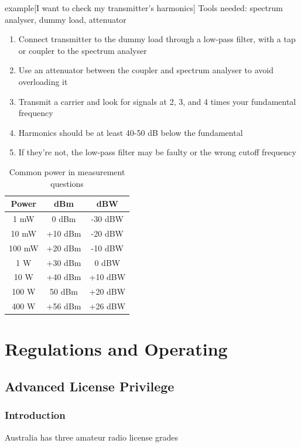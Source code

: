 \documentclass{article}
\begin{document}
\begin{callout}{example}[I want to check my transmitter's harmonics]
    Tools needed: spectrum analyser, dummy load, attenuator
    \begin{enumerate}
        \item Connect transmitter to the dummy load through a low-pass filter, with a tap or coupler to the spectrum analyser
        \item Use an attenuator between the coupler and spectrum analyser to avoid overloading it
        \item Transmit a carrier and look for signals at 2, 3, and 4 times your fundamental frequency
        \item Harmonics should be at least 40-50 dB below the fundamental
        \item If they're not, the low-pass filter may be faulty or the wrong cutoff frequency
    \end{enumerate}
\end{callout}

\begin{table}[h]
    \centering
    \caption{Common power in measurement questions}
    \label{tab:9}
    \begin{tabular}{c|c|c}
        Power & dBm & dBW \\
        \hline
        \hline
        1 mW & 0 dBm & -30 dBW \\
        10 mW & +10 dBm & -20 dBW \\
        100 mW & +20 dBm & -10 dBW \\
        1 W & +30 dBm & 0 dBW \\
        10 W & +40 dBm & +10 dBW \\
        100 W & 50 dBm & +20 dBW \\
        400 W & +56 dBm & +26 dBW
    \end{tabular}
\end{table}

\section{Regulations and Operating}
\subsection{Advanced License Privilege}
\subsubsection{Introduction}
Australia has three amateur radio license grades
\end{document}
